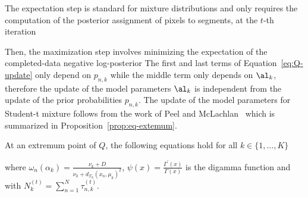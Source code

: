 \documentclass[a4paper,12pt]{article}
\begin{document}
The expectation step is standard for mixture distributions and only requires the computation of the posterior assignment of pixels to segments, at the $t$-th iteration 

Then, the maximization step involves minimizing the expectation of the completed-data negative log-posterior 
The first and last terms of Equation~\eqref{eq:Q-update} only depend on $p_{n,k}$ while the middle term only depends on $\al_k$, therefore the update of the model parameters $\al_k$ is independent from the update of the prior probabilities $p_{n,k}$. The update of the model parameters for Student-t mixture follows from the work of Peel and McLachlan~\cite{peel2000robust} which is summarized in Proposition~\ref{prop:eq-extemum}.
\begin{prop}
\label{prop:eq-extemum}
At an extremum point of $Q$, the following equations hold for all $k\in \{1,\dots,K\}$ 

\vspace{2mm}
\noindent
\begin{minipage}{0.4\linewidth}
\end{minipage}
\hspace{1mm}
\begin{minipage}{0.58\linewidth}
\end{minipage}
\vspace{4mm}
where $\omega_{n}(\alpha_k) =  \frac{\nu_k+D}{\nu_k+d_{\Sigma_k}(x_n,\mu_k)^2}$, $\psi(x) = \frac{\Gamma^\prime(x)}{\Gamma(x)}$ is the digamma function and
with $N_k^{(t)}=\sum_{n=1}^N \tau_{n,k}^{(t)} $.
\end{prop}
\end{document}
